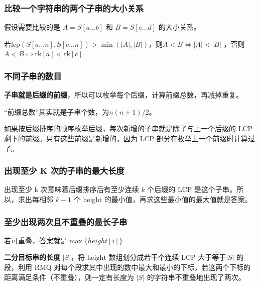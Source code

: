 \subsubsection{比较一个字符串的两个子串的大小关系}

\begin{tcolorbox}
\par \noindent 假设需要比较的是 $A=S[a...b]$ 和  $B=S[c...d]$ 的大小关系。
\end{tcolorbox}
\par \noindent 若$\text{lcp}(S[a...n],S[c...n])>\min(|A|,|B|)$，则$A<B \Leftrightarrow |A| <|B|$ ，否则$A<B \Leftrightarrow \text{rk}[a] <\text{rk}[c]$ 

\subsubsection{不同子串的数目}
\par \noindent 
\par \noindent \textbf{子串就是后缀的前缀}，所以可以枚举每个后缀，计算前缀总数，再减掉重复。
~\\
\par \noindent “前缀总数”其实就是子串个数，为$n(n+1)/2$。
~\\
\par \noindent 如果按后缀排序的顺序枚举后缀，每次新增的子串就是除了与上一个后缀的 LCP 剩下的前缀。只有这些前缀是新增的，因为 LCP 部分在枚举上一个前缀时计算过了。

\subsubsection{出现至少 K 次的子串的最大长度}
\par \noindent 
\par 出现至少 k 次意味着后缀排序后有至少连续 $k$ 个后缀的 LCP 是这个子串。所以，求出每相邻 $k-1$ 个 height 的最小值，再求这些最小值的最大值就是答案。\par 
\subsubsection{至少出现两次且不重叠的最长子串}
\par \noindent 若可重叠，答案就是$\max\{height[i]\}$
~\\
\par \noindent \textbf{二分目标串的长度} $|S|$，将 $\text{height}$ 数组划分成若干个连续 LCP 大于等于$|S|$ 的段，利用 RMQ 对每个段求其中出现的数中最大和最小的下标，若这两个下标的距离满足条件（不重叠），则一定有长度为 $|S|$ 的字符串不重叠地出现了两次。

